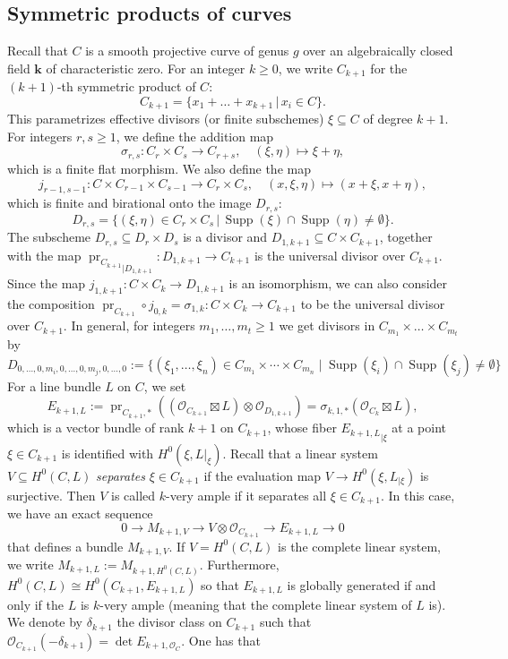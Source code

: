 \documentclass[12pt]{amsart}
\numberwithin{equation}{section}
\numberwithin{thmcounter}{section}
\theoremstyle{definition}
\theoremstyle{claim}
\newcommand{\kk}{\mathbf{k}}
\newcommand{\sO}{\mathscr{O}}
\DeclareMathOperator{\pr}{pr}
\DeclareMathOperator{\Supp}{Supp}
\begin{document}
\subsection{Symmetric products of curves}\label{subsec:symcur} 
Recall that $C$ is a smooth projective curve of genus $g$ over an algebraically closed field $\kk$ of characteristic zero. For an integer $k\geq 0$, we write $C_{k+1}$ for the $(k+1)$-th symmetric product of $C$:
\[ C_{k+1} = \{ x_1+\dots+x_{k+1} \,|\, x_i \in C \}. \]
This parametrizes effective divisors (or finite subschemes) $\xi\subseteq C$ of degree $k+1$.  For integers $r,s \geq 1$, we define the addition map
$$
\sigma_{r,s} \colon C_r \times C_s \longrightarrow C_{r+s}, \quad (\xi,\eta) \longmapsto \xi+\eta,
$$
which is a finite flat morphism. We also define the map
$$
j_{r-1,s-1}\colon C\times C_{r-1} \times C_{s-1} \longrightarrow C_r\times C_s, \quad (x,\xi,\eta) \longmapsto (x+\xi,x+\eta),
$$
which is finite and birational onto the image $D_{r,s}$:
$$
D_{r,s} = \{ (\xi,\eta) \in C_r\times C_s \,|\, \Supp(\xi) \cap \Supp(\eta) \ne \emptyset \}.
$$
The subscheme $D_{r,s}\subseteq D_r\times D_s$ is a divisor and  $D_{1,k+1} \subseteq C\times C_{k+1}$, together with the map ${\pr_{C_{k+1}}}_{|D_{1,k+1}}\colon D_{1,k+1} \to C_{k+1}$ is the universal divisor over $C_{k+1}$. Since the map $j_{1,k+1}\colon C\times C_k \to D_{1,k+1}$ is an isomorphism, we can also consider the composition $\pr_{C_{k+1}}\circ j_{0,k} = \sigma_{1,k}\colon C\times C_{k} \to C_{k+1}$ to be the universal divisor over $C_{k+1}$. In general,  for
integers $m_1, \ldots, m_t \geq 1$ we get divisors in $C_{m_1}\times \dots \times C_{m_t}$ by
$$
D_{0, \ldots, 0, m_i, 0, \ldots, 0, m_j , 0, \ldots, 0}:=\{(\xi_1, \ldots, \xi_n) \in C_{m_1} \times \cdots \times C_{m_n} \mid \Supp(\xi_i) \cap \Supp(\xi_j) \neq \emptyset\}
$$
For a line bundle $L$ on $C$, we set
$$
E_{k+1,L}:= \pr_{C_{k+1},*}((\sO_{C_{k+1}}\boxtimes L) \otimes \sO_{D_{1,k+1}}) = \sigma_{k,1,*} (\sO_{C_k} \boxtimes L),
$$
which is a vector bundle of rank $k+1$ on $C_{k+1}$, whose fiber ${E_{k+1,L}}_{|\xi}$ at a point $
\xi\in C_{k+1}$ is identified with $H^0(\xi, L|_{\xi})$. Recall that a linear system $V\subseteq H^0(C,L)$  \emph{separates} $\xi\in C_{k+1}$ if the evaluation map $V\to H^0(\xi,L_{|\xi})$ is surjective. Then $V$ is called $k$-very ample if it separates all $\xi \in C_{k+1}$. In this case, we have an exact sequence
\[ 0 \longrightarrow M_{k+1,V} \longrightarrow V\otimes \sO_{C_{k+1}} \longrightarrow E_{k+1,L} \longrightarrow 0 \]
that defines a bundle $M_{k+1,V}$. If $V=H^0(C,L)$ is the complete linear system, we write $M_{k+1,L}:= M_{k+1,H^0(C,L)}$. Furthermore, $H^0(C,L) \cong H^0(C_{k+1},E_{k+1,L})$ so that $E_{k+1,L}$ is globally generated if and only if the $L$ is $k$-very ample (meaning that the complete linear system of $L$ is). We denote by $\delta_{k+1}$ the divisor class on $C_{k+1}$  such that $\sO_{C_{k+1}}(-\delta_{k+1}) = \det E_{k+1, \sO_C}$. One has that
\end{document}
